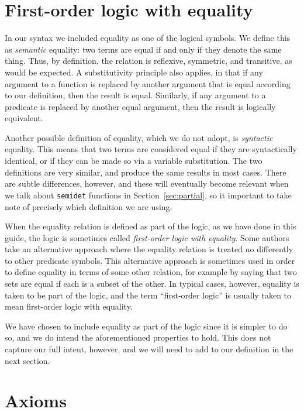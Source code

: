 \section{First-order logic with equality}
\label{sec:sem-equality}

In our syntax we included equality
as one of the logical symbols.
We define this as \emph{semantic} equality\label{gi:semantic-equality}:
two terms are equal if and only if they denote the same thing.
Thus, by definition, the relation is
reflexive, symmetric, and transitive,
as would be expected.
A substitutivity principle also applies,
in that if any argument to a function
is replaced by another argument that is equal according to our definition,
then the result is equal.
Similarly, if any argument to a predicate
is replaced by another equal argument,
then the result is logically equivalent.

Another possible definition of equality,
which we do not adopt,
is \emph{syntactic} equality.
This means that two terms are considered equal
if they are syntactically identical,
or if they can be made so via a variable substitution.
The two definitions are very similar,
and produce the same results in most cases.
There are subtle differences, however,
and these will eventually become relevant
when we talk about \texttt{semidet} functions
in Section~\ref{sec:partial},
so it important to take note of
precisely which definition we are using.

When the equality relation is defined as part of the logic,
as we have done in this guide,
the logic is sometimes called
\emph{first-order logic with equality}.
Some authors take an alternative approach where
the equality relation is treated
no differently to other predicate symbols.
This alternative approach is sometimes used in order to
define equality in terms of some other relation,
for example by saying that
two sets are equal if each is a subset of the other.
In typical cases, however,
equality is taken to be part of the logic,
and the term ``first-order logic''
is usually taken to mean first-order logic with equality.

We have chosen to include equality as part of the logic
since it is simpler to do so,
and we do intend the aforementioned properties to hold.
This does not capture our full intent, however,
and we will need to add to our definition in the next section.


\section{Axioms}
\label{sec:axioms}

